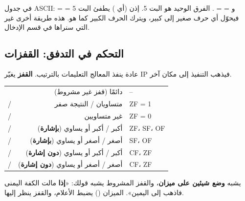 \begin{khatwa}
    في جدول \textenglish{ASCII}: \textenglish{ =  = } و\textenglish{ =  = }.
    الفرق الوحيد هو البت 5. إذن  (أي ) يطفئ البت 5 فيحوّل أي حرف صغير إلى كبير،
    ويترك الحرف الكبير كما هو. هذه طريقة أخرى غير  التي سنراها في قسم الإدخال.
\end{khatwa}

\subsection{التحكم في التدفق: القفزات}
عادة ينفذ المعالج التعليمات بالترتيب. \textbf{القفز} يغيّر \textenglish{IP} فيذهب التنفيذ إلى مكان آخر.

\begin{center}
\small
\begin{tabularx}{\linewidth}{|l|R|l|}
    \hline
     &  &  \\ \hline
     & دائمًا (قفز غير مشروط) & -- \\ \hline
     /  & متساويان / النتيجة صفر & \textenglish{ZF = 1} \\ \hline
     /  & غير متساويين & \textenglish{ZF = 0} \\ \hline
     /  & أكبر / أكبر أو يساوي (\textbf{بإشارة}) & \textenglish{ZF}، \textenglish{SF}، \textenglish{OF} \\ \hline
     /  & أصغر / أصغر أو يساوي (\textbf{بإشارة}) & \textenglish{SF}، \textenglish{OF} \\ \hline
     /  & أكبر / أكبر أو يساوي (\textbf{دون إشارة}) & \textenglish{CF}، \textenglish{ZF} \\ \hline
     /  & أصغر / أصغر أو يساوي (\textbf{دون إشارة}) & \textenglish{CF}، \textenglish{ZF} \\ \hline
\end{tabularx}
\end{center}

\begin{tashbih}
     يشبه \textbf{وضع شيئين على ميزان}، والقفز المشروط يشبه قولك: «\textbf{إذا} مالت الكفة اليمنى
    فاذهب إلى اليمين». الميزان () يضبط الأعلام، والقفز ينظر إليها.
\end{tashbih}

